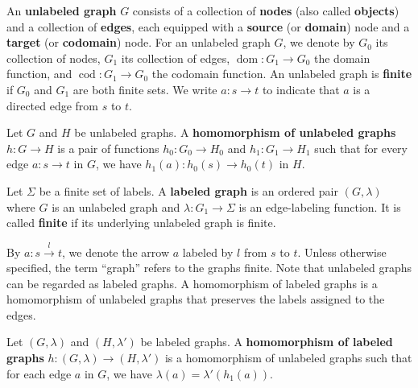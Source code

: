 \begin{definition}
    \label{def:graph:unlabeled}
    An \textbf{unlabeled graph} \( G \) consists of a collection of \textbf{nodes} (also called \textbf{objects}) and a collection of \textbf{edges}, each equipped with a \textbf{source} (or \textbf{domain}) node and a \textbf{target} (or \textbf{codomain}) node. 
    For an unlabeled graph \( G \), we denote by \( G_0 \) its collection of nodes, \( G_1 \) its collection of edges, \( \operatorname{dom}:G_1{\to}G_0 \) the domain function, and \( \operatorname{cod}:G_1{\to}G_0 \) the codomain function. An unlabeled graph is \textbf{finite} if \( G_0 \) and \( G_1 \) are both finite sets.
    We write \( a: s \to t \) to indicate that \( a \) is a directed edge from \( s \) to \( t \). 
\end{definition}   
\begin{definition}
    \label{def:unlabeled_graph:homomorphism}
    Let \( G \) and \( H \) be unlabeled graphs. A \textbf{homomorphism of unlabeled graphs} $h: G \to H$ is a pair of functions $h_0: G_0 \to H_0 $ and $h_1: G_1 \to H_1$ such that for every edge \( a: s \to t \) in \( G \), we have \( h_1(a) : h_0(s) \to h_0(t) \) in \( H \).
\end{definition}
\begin{definition}
    \label{def:graph}
    Let \(\Sigma\) be a finite set of labels. A \textbf{labeled graph} is an ordered pair \((G,\lambda)\) where \( G \) is an unlabeled graph and \( \lambda : G_1 \rightarrow \Sigma\) is an edge-labeling function. 
    It is called \textbf{finite} if its underlying unlabeled graph is finite.  
\end{definition}
By $a : s\overset{l}{\rightarrow} t$, we denote the arrow $a$ labeled by $l$ from $s$ to $t$. Unless otherwise specified, the term \enquote{graph} refers to the graphs finite. Note that unlabeled graphs can be regarded as labeled graphs. A homomorphism of labeled graphs is a homomorphism of unlabeled graphs that preserves the labels assigned to the edges.
\begin{definition}
    \label{def:graph:homomorphism}
    Let \( (G,\lambda) \) and \( (H,\lambda') \) be labeled graphs. A \textbf{homomorphism of labeled graphs} $h:(G,\lambda) \rightarrow (H,\lambda')$ is a homomorphism of unlabeled graphs such that for each edge \( a \) in \( G \), we have \( \lambda (a) = \lambda' (h_1 (a)) \).
\end{definition}
